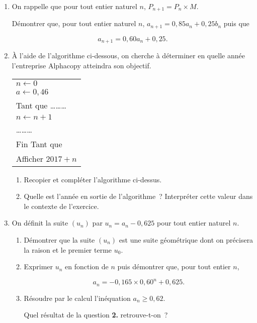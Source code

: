 \begin{enumerate}
     \item On rappelle que pour tout entier naturel $n$, $P_{n+1}=P_n \times M$.
     \par
     Démontrer que, pour tout entier naturel $n$, $a_{n+1}= 0,85 a_n + 0,25 b_n$ puis que
     \par
     \[a_{n+1} = 0,60 a_n + 0,25.\]
     \par
     \item À l'aide de l'algorithme ci-dessous, on cherche à déterminer en quelle année l'entreprise Alphacopy atteindra son objectif.
     \begin{center}
          \begin{extern}%
               \begin{tabular}{|p{3.5cm}|}
                    \hline
                    $n \leftarrow 0$\\
                    $a\leftarrow 0,46$\\
                    Tant que \ldots\ldots\ldots\\
                    \hspace*{1cm} $n\leftarrow n+1$\\
                    \hspace*{1cm} \ldots\ldots\ldots\\
                    Fin Tant que\\
                    Afficher $2017+n$\\
                    \hline
               \end{tabular}
          \end{extern}
     \end{center}
     \begin{enumerate}[label=\alph*.]
          \item Recopier et compléter l'algorithme ci-dessus.
          \item Quelle est l'année en sortie de l'algorithme~? Interpréter cette valeur dans le contexte de l'exercice.
     \end{enumerate}
     \item On définit la suite $\left(u_n\right)$ par $u_n=a_n-0,625$ pour tout entier naturel $n$.
     \begin{enumerate}[label=\alph*.]
          \item Démontrer que la suite $\left(u_n\right)$ est une suite géométrique dont on précisera la raison et le premier terme $u_0$.
          \item Exprimer $u_n$ en fonction de $n$ puis démontrer que, pour tout entier $n$,
          \par
          \[a_n=-0,165 \times 0,60^n + 0,625.\]
          \par
          \item Résoudre par le calcul l'inéquation $a_n \geqslant 0,62$.
          \par
          Quel résultat de la question \textbf{2.} retrouve-t-on~?
     \end{enumerate}
\end{enumerate}
